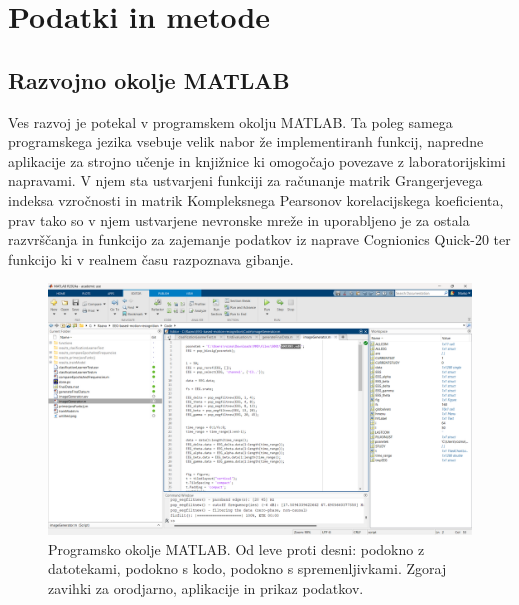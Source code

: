 \chapter{Podatki in metode}
\section{Razvojno okolje MATLAB}
Ves razvoj je potekal v programskem okolju MATLAB. Ta poleg samega programskega jezika vsebuje velik nabor že implementiranh funkcij, napredne aplikacije za strojno učenje in knjižnice ki omogočajo povezave z laboratorijskimi napravami. V njem sta ustvarjeni funkciji za računanje matrik Grangerjevega indeksa vzročnosti
in matrik Kompleksnega Pearsonov korelacijskega koeficienta, prav tako so v njem ustvarjene nevronske mreže in uporabljeno je za ostala razvrščanja in funkcijo za zajemanje podatkov iz naprave Cognionics Quick-20 ter funkcijo ki v realnem času razpoznava gibanje. \cite{MATLAB}
\begin{figure}[h!]
    \begin{center}
    \includegraphics[width=1\linewidth]{slike/Matlab.png}
    \end{center}
    \caption{Programsko okolje MATLAB. Od leve proti desni: podokno z datotekami, podokno s kodo, podokno s spremenljivkami. Zgoraj zavihki za orodjarno, aplikacije in prikaz podatkov.}
    \end{figure}
    
